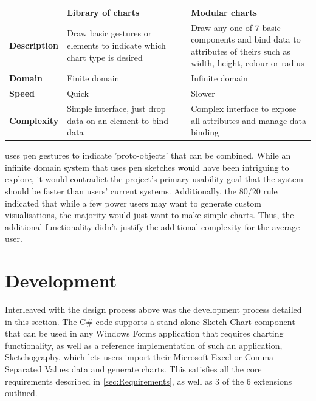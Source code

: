 	\begin{table}[h]
	\begin{tabular}{p{0.15 \linewidth} p{0.425 \linewidth} p{0.425 \linewidth}}
	
									& 
	\bfseries Library of charts 	& 
	\bfseries Modular charts 		\\
	
	\textbf{Description} 																&
	Draw basic gestures or elements to indicate which chart type is desired 	& 
	Draw any one of 7 basic components and 
	bind data to attributes of theirs such as width, height, colour or radius
	\vspace{6 \lineskip} 	\\
	
	\textbf{Domain} 				&
	Finite domain 		& 
	Infinite domain 	\\
	
	\textbf{Speed} 				&
	Quick				& 
	Slower 				\\
	
	\textbf{Complexity}															&
	Simple interface, just drop data on an element to bind data			& 
	Complex interface to expose all attributes and manage data binding 	\\
	\end{tabular}
	\end{table}
	
	\cite{chao_poster:_2010} uses pen gestures to indicate 'proto-objects' that can be combined. While an infinite domain system that uses pen sketches would have been intriguing to explore, it would contradict the project's primary usability goal that the system should be faster than users' current systems. Additionally, the 80/20 rule indicated that while a few power users may want to generate custom visualisations, the majority would just want to make simple charts. Thus, the additional functionality didn't justify the additional complexity for the average user.
	


	\section{Development}
	Interleaved with the design process above was the development process detailed in this section. The C\# code supports a stand-alone Sketch Chart component that can be used in any Windows Forms application that requires charting functionality, as well as a reference implementation of such an application, Sketchography, which lets users import their Microsoft Excel or Comma Separated Values data and generate charts. This satisfies all the core requirements described in \autoref{sec:Requirements}, as well as 3 of the 6 extensions outlined.
	
